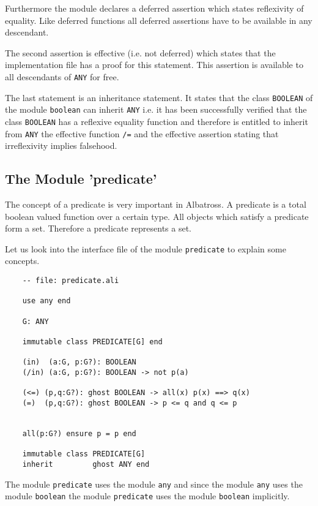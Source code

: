 Furthermore the module declares a deferred assertion which states reflexivity
of equality. Like deferred functions all deferred assertions have to be
available in any descendant.

The second assertion is effective (i.e. not deferred) which states that the
implementation file has a proof for this statement. This assertion is
available to all descendants of \lstinline!ANY! for free.

The last statement is an inheritance statement. It states that the class
\lstinline!BOOLEAN! of the module \lstinline!boolean! can inherit
\lstinline!ANY! i.e. it has been successfully verified that the class
\lstinline!BOOLEAN! has a reflexive equality function and therefore is
entitled to inherit from \lstinline!ANY! the effective function \lstinline!/=!
and the effective assertion stating that irreflexivity implies falsehood.



\subsection{The Module 'predicate'}

The concept of a predicate is very important in Albatross. A predicate is a
total boolean valued function over a certain type. All objects which satisfy a
predicate form a set. Therefore a predicate represents a set.

Let us look into the interface file of the module \lstinline!predicate! to
explain some concepts.

\begin{lstlisting}
    -- file: predicate.ali

    use any end

    G: ANY

    immutable class PREDICATE[G] end

    (in)  (a:G, p:G?): BOOLEAN
    (/in) (a:G, p:G?): BOOLEAN -> not p(a)

    (<=) (p,q:G?): ghost BOOLEAN -> all(x) p(x) ==> q(x)
    (=)  (p,q:G?): ghost BOOLEAN -> p <= q and q <= p


    all(p:G?) ensure p = p end

    immutable class PREDICATE[G]
    inherit         ghost ANY end
\end{lstlisting}

The module \lstinline!predicate! uses the module \lstinline!any! and since the
module \lstinline!any! uses the module \lstinline!boolean! the module
\lstinline!predicate! uses the module \lstinline!boolean! implicitly.

